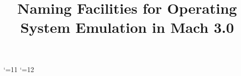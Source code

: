 \topmargin -0.75in
\textheight 9.6in
\textwidth 7.125in
\marginparwidth -107pt
\oddsidemargin -17pt
\evensidemargin -22pt
\catcode`\@=11
\def\section{\@startsection {section}{1}{\z@}{-3.5ex plus -1ex minus 
    -.2ex}{2.3ex plus .2ex}{\large\centering}}
\def\subsection{\@startsection{subsection}{2}{\z@}{-3.25ex plus -1ex minus 
   -.2ex}{1.5ex plus .2ex}{\normalsize\it}}
\def\realsubsubsection{\@startsection{subsubsection}{3}{\parindent}
         {3.25ex plus 1ex minus .2ex}{-1.5em}{\normalsize\it}}
\def\realparagraph{\@startsection
     {paragraph}{4}{\parindent}{3.25ex plus 1ex minus .2ex}
     {-1.5em}{\normalsize\it}}
\catcode`\@=12
\def\subsubsection#1{\realsubsubsection{#1:}}
\def\paragraph#1{\realparagraph{#1:}}
\setcounter{secnumdepth}{4}
\def\thesection{\Roman{section}.}
\def\thesubsection{\it\Alph{subsection}.}
\def\thesubsubsection{ {\it\arabic{subsubsection})} }
\def\theparagraph{ {\it\alph{paragraph})} }
\def\thebibliography#1{\section*{REFERENCES
 }\list
 {[\arabic{enumi}]}{\settowidth\labelwidth{[#1]}\leftmargin\labelwidth
 \advance\leftmargin\labelsep
 \usecounter{enumi}}
 \def\newblock{\hskip .11em plus .33em minus .07em}
 \sloppy\clubpenalty4000\widowpenalty4000
 \sfcode`\.=1000\relax}
\let\endthebibliography=\endlist

%
\newcommand{\comment}[1]{}

\title{Naming Facilities for Operating System Emulation in Mach 3.0}

